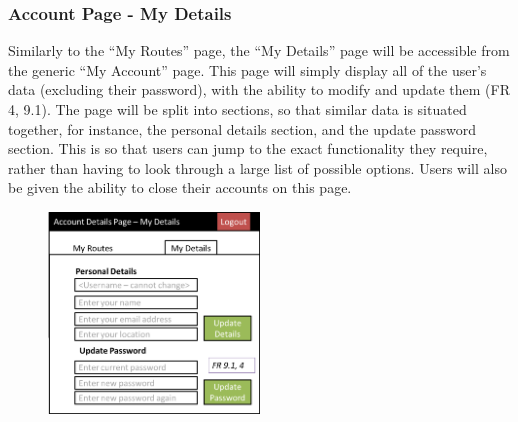 \documentclass[a4paper,twoside,notitlepage,11pt]{article}
\begin{document}
\subsubsection{Account Page - My Details}
Similarly to the ``My Routes'' page, the ``My Details'' page will be accessible from the generic ``My Account'' page. This page will simply display all of the user's data (excluding their password), with the ability to modify and update them (FR 4, 9.1). The page will be split into sections, so that similar data is situated together, for instance, the personal details section, and the update password section. This is so that users can jump to the exact functionality they require, rather than having to look through a large list of possible options. Users will also be given the ability to close their accounts on this page. 
\begin{figure}[!ht]
	\begin{center}
		\includegraphics[width=0.5\textwidth]{images/ui-mydetails.png}
	\end{center}
	\vspace{-12mm}
\end{figure}
\end{document}
